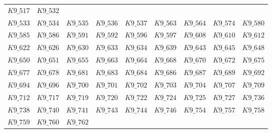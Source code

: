 \documentclass{amsart} %
\theoremstyle{thm}
\theoremstyle{definition}
\numberwithin{equation}{section}
\begin{document}
{\begin{longtable}{@{}lllllllll@{}}
  $K9\_517$ &
  $K9\_532$ \\
  $K9\_533$ &
  $K9\_534$ &
  $K9\_535$ &
  $K9\_536$ &
  $K9\_537$ &
  $K9\_563$ &
  $K9\_564$ &
  $K9\_574$ &
  $K9\_580$ \\
  $K9\_585$ &
  $K9\_586$ &
  $K9\_591$ &
  $K9\_592$ &
  $K9\_596$ &
  $K9\_597$ &
  $K9\_608$ &
  $K9\_610$ &
  $K9\_612$ \\
  $K9\_622$ &
  $K9\_626$ &
  $K9\_630$ &
  $K9\_633$ &
  $K9\_634$ &
  $K9\_639$ &
  $K9\_643$ &
  $K9\_645$ &
  $K9\_648$ \\
  $K9\_650$ &
  $K9\_651$ &
  $K9\_655$ &
  $K9\_663$ &
  $K9\_664$ &
  $K9\_668$ &
  $K9\_670$ &
  $K9\_672$ &
  $K9\_675$ \\
  $K9\_677$ &
  $K9\_678$ &
  $K9\_681$ &
  $K9\_683$ &
  $K9\_684$ &
  $K9\_686$ &
  $K9\_687$ &
  $K9\_689$ &
  $K9\_692$ \\
  $K9\_694$ &
  $K9\_696$ &
  $K9\_700$ &
  $K9\_701$ &
  $K9\_702$ &
  $K9\_703$ &
  $K9\_704$ &
  $K9\_707$ &
  $K9\_709$ \\
  $K9\_712$ &
  $K9\_717$ &
  $K9\_719$ &
  $K9\_720$ &
  $K9\_722$ &
  $K9\_724$ &
  $K9\_725$ &
  $K9\_727$ &
  $K9\_736$ \\
  $K9\_738$ &
  $K9\_740$ &
  $K9\_741$ &
  $K9\_743$ &
  $K9\_744$ &
  $K9\_746$ &
  $K9\_754$ &
  $K9\_757$ &
  $K9\_758$ \\
  $K9\_759$ &
  $K9\_760$ &
  $K9\_762$ &&&&&&\\
\end{longtable}}

\newpage
 \let\MRhref\undefined
 
 
\end{document}
